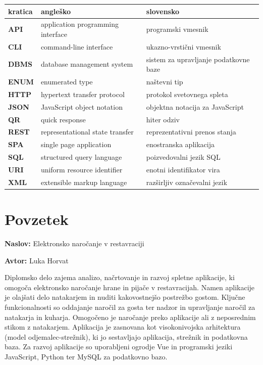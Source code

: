 \documentclass[a4paper, 12pt]{book}
\newcommand{\ttitle}{Elektronsko naročanje v restavraciji}
\newcommand{\tauthor}{Luka Horvat}
\newcommand{\clearemptydoublepage}{\newpage{\pagestyle{empty}\cleardoublepage}}
\begin{document}
\noindent\begin{tabular}{p{}|p{}|p{}}    %
  {\bf kratica} & {\bf angleško}                             & {\bf slovensko} \\ \hline
  {\bf API}   &  application programming interface              & programski vmesnik\\
  {\bf CLI}   & command-line interface              & ukazno-vrstični vmesnik \\
  {\bf DBMS}   &  database management system              & sistem za upravljanje podatkovne baze \\
  {\bf ENUM}   & enumerated type              & naštevni tip \\
  {\bf HTTP}   &  hypertext transfer protocol               &  protokol svetovnega spleta \\
  {\bf JSON}   &  JavaScript object notation               &  objektna notacija za JavaScript \\
  {\bf QR}   &  quick response              & hiter odziv\\
  {\bf REST}   & representational state transfer              & reprezentativni prenos stanja \\
  {\bf SPA}      & single page application               &  enostranska aplikacija \\	
  {\bf SQL} & structured query language & poizvedovalni jezik SQL  \\
  {\bf URI}   &  uniform resource identifier              & enotni identifikator vira \\
  {\bf XML}   &  extensible markup language              & razširljiv označevalni jezik \\

\end{tabular}


\clearemptydoublepage

\chapter*{Povzetek}

\noindent\textbf{Naslov:} \ttitle
\bigskip

\noindent\textbf{Avtor:} \tauthor
\bigskip


\noindent 
Diplomsko delo zajema analizo, načrtovanje in razvoj spletne aplikacije, ki omogoča elektronsko naročanje hrane in pijače v restavracijah. Namen aplikacije je olajšati delo natakarjem in nuditi kakovostnejšo postrežbo gostom. Ključne funkcionalnosti so oddajanje naročil za gosta ter nadzor in upravljanje naročil za natakarja in kuharja. Omogočeno je naročanje preko aplikacije ali z neposrednim stikom z natakarjem. Aplikacija je zasnovana kot visokonivojska arhitektura (model odjemalec-strežnik), ki jo sestavljajo aplikacija, strežnik in podatkovna baza. Za razvoj aplikacije so uporabljeni ogrodje Vue in programski jeziki JavaScript, Python ter MySQL za podatkovno bazo.
\bigskip
\end{document}
